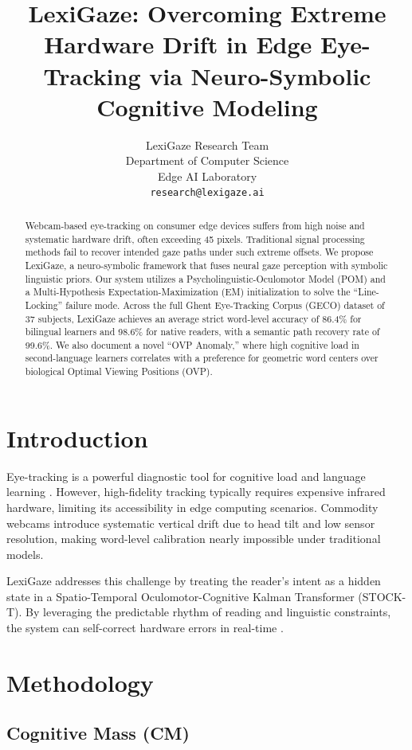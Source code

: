 \documentclass{article}
\title{LexiGaze: Overcoming Extreme Hardware Drift in Edge Eye-Tracking via Neuro-Symbolic Cognitive Modeling}
\author{%
  LexiGaze Research Team \\
  Department of Computer Science \\
  Edge AI Laboratory \\
  \texttt{research@lexigaze.ai} \\
}
\begin{document}
\maketitle

\begin{abstract}
Webcam-based eye-tracking on consumer edge devices suffers from high noise and systematic hardware drift, often exceeding 45 pixels. Traditional signal processing methods fail to recover intended gaze paths under such extreme offsets. We propose LexiGaze, a neuro-symbolic framework that fuses neural gaze perception with symbolic linguistic priors. Our system utilizes a Psycholinguistic-Oculomotor Model (POM) and a Multi-Hypothesis Expectation-Maximization (EM) initialization to solve the ``Line-Locking'' failure mode. Across the full Ghent Eye-Tracking Corpus (GECO) dataset of 37 subjects, LexiGaze achieves an average strict word-level accuracy of 86.4\% for bilingual learners and 98.6\% for native readers, with a semantic path recovery rate of 99.6\%. We also document a novel ``OVP Anomaly,'' where high cognitive load in second-language learners correlates with a preference for geometric word centers over biological Optimal Viewing Positions (OVP).
\end{abstract}

\section{Introduction}

Eye-tracking is a powerful diagnostic tool for cognitive load and language learning \cite{cop2017geco}. However, high-fidelity tracking typically requires expensive infrared hardware, limiting its accessibility in edge computing scenarios. Commodity webcams introduce systematic vertical drift due to head tilt and low sensor resolution, making word-level calibration nearly impossible under traditional models.

LexiGaze addresses this challenge by treating the reader's intent as a hidden state in a Spatio-Temporal Oculomotor-Cognitive Kalman Transformer (STOCK-T). By leveraging the predictable rhythm of reading and linguistic constraints, the system can self-correct hardware errors in real-time \cite{urquiza2026robust}.

\section{Methodology}

\subsection{Cognitive Mass (CM)}
\end{document}

